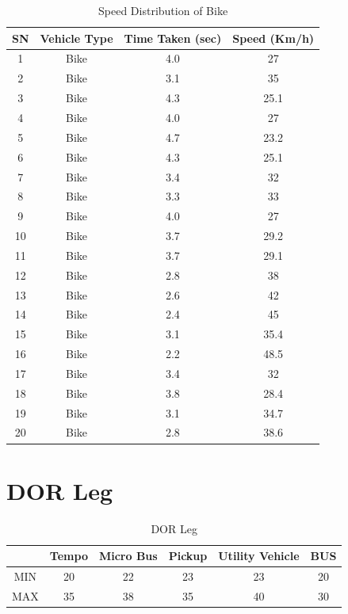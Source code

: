 \begin{table}[h!]
    \centering
    \caption{Speed Distribution of Bike}
    \begin{tabular}{|c|c|c|c|}
        \hline
        \textbf{SN}	& \textbf{Vehicle Type}	& \textbf{Time Taken (sec)}	& \textbf{Speed (Km/h)} \\ \hline
        
        1	&Bike	&4.0	&27 \\ \hline
        2	&Bike	&3.1	&35 \\ \hline
        3	&Bike	&4.3	&25.1 \\ \hline
        4	&Bike	&4.0	&27 \\ \hline
        5	&Bike	&4.7	&23.2 \\ \hline
        6	&Bike	&4.3	&25.1 \\ \hline
        7	&Bike	&3.4	&32 \\ \hline
        8	&Bike	&3.3	&33 \\ \hline
        9	&Bike	&4.0	&27 \\ \hline
        10	&Bike	&3.7	&29.2 \\ \hline
        11	&Bike	&3.7	&29.1 \\ \hline
        12	&Bike	&2.8	&38 \\ \hline
        13	&Bike	&2.6	&42 \\ \hline
        14	&Bike	&2.4	&45 \\ \hline
        15	&Bike	&3.1	&35.4 \\ \hline
        16	&Bike	&2.2	&48.5 \\ \hline
        17	&Bike	&3.4	&32 \\ \hline
        18	&Bike	&3.8	&28.4 \\ \hline
        19	&Bike	&3.1	&34.7 \\ \hline
        20	&Bike	&2.8	&38.6 \\ \hline


    \end{tabular}
\end{table}
\clearpage
\section{DOR Leg}

\begin{table}[h!]
    \centering
    \caption{DOR Leg}
    \begin{tabular}{|c|c|c|c|c|c|}
        \hline
        &Tempo	&Micro Bus	&Pickup	&Utility Vehicle & BUS \\
        \hline
        MIN	&20	&22	&23	&23	&20 \\ \hline
        MAX	&35	&38	&35	&40	&30 \\ \hline
    \end{tabular}
\end{table}
